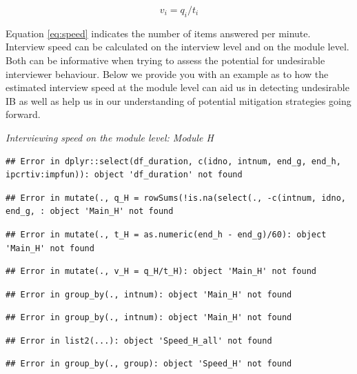 \documentclass[
  11pt,
  a4paperpaper,
]{article}
\begin{document}
\begin{equation}
  \label{eq:speed}
  v_i=q_i/t_i
  \end{equation}

Equation \ref{eq:speed} indicates the number of items answered per
minute. Interview speed can be calculated on the interview level and on
the module level. Both can be informative when trying to assess the
potential for undesirable interviewer behaviour. Below we provide you
with an example as to how the estimated interview speed at the module
level can aid us in detecting undesirable IB as well as help us in our
understanding of potential mitigation strategies going forward.

\emph{Interviewing speed on the module level: Module H}

\begin{verbatim}
## Error in dplyr::select(df_duration, c(idno, intnum, end_g, end_h, ipcrtiv:impfun)): object 'df_duration' not found
\end{verbatim}

\begin{verbatim}
## Error in mutate(., q_H = rowSums(!is.na(select(., -c(intnum, idno, end_g, : object 'Main_H' not found
\end{verbatim}

\begin{verbatim}
## Error in mutate(., t_H = as.numeric(end_h - end_g)/60): object 'Main_H' not found
\end{verbatim}

\begin{verbatim}
## Error in mutate(., v_H = q_H/t_H): object 'Main_H' not found
\end{verbatim}

\begin{verbatim}
## Error in group_by(., intnum): object 'Main_H' not found
\end{verbatim}

\begin{verbatim}
## Error in group_by(., intnum): object 'Main_H' not found
\end{verbatim}

\begin{verbatim}
## Error in list2(...): object 'Speed_H_all' not found
\end{verbatim}

\begin{verbatim}
## Error in group_by(., group): object 'Speed_H' not found
\end{verbatim}
\end{document}
